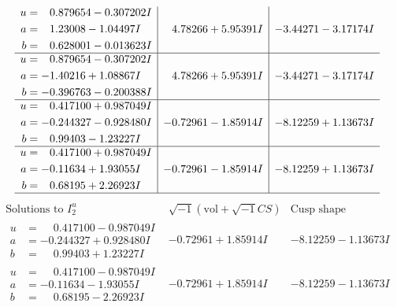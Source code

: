 \documentclass[1p]{elsarticle_modified}
\theoremstyle{definition}
\newcommand{\I}{\sqrt{-1}}
\begin{document}
$$\begin{array}{c|c|c}
\begin{aligned}
u &= \phantom{-}0.879654 - 0.307202 I \\
a &= \phantom{-}1.23008 - 1.04497 I \\
b &= \phantom{-}0.628001 - 0.013623 I\end{aligned}
 & \phantom{-}4.78266 + 5.95391 I & -3.44271 - 3.17174 I \\ \hline\begin{aligned}
u &= \phantom{-}0.879654 - 0.307202 I \\
a &= -1.40216 + 1.08867 I \\
b &= -0.396763 - 0.200388 I\end{aligned}
 & \phantom{-}4.78266 + 5.95391 I & -3.44271 - 3.17174 I \\ \hline\begin{aligned}
u &= \phantom{-}0.417100 + 0.987049 I \\
a &= -0.244327 - 0.928480 I \\
b &= \phantom{-}0.99403 - 1.23227 I\end{aligned}
 & -0.72961 - 1.85914 I & -8.12259 + 1.13673 I \\ \hline\begin{aligned}
u &= \phantom{-}0.417100 + 0.987049 I \\
a &= -0.11634 + 1.93055 I \\
b &= \phantom{-}0.68195 + 2.26923 I\end{aligned}
 & -0.72961 - 1.85914 I & -8.12259 + 1.13673 I\\
 \hline 
 \end{array}$$\newpage$$\begin{array}{c|c|c}  
\text{Solutions to }I^u_{2}& \I (\text{vol} + \sqrt{-1}CS) & \text{Cusp shape}\\
 \hline 
\begin{aligned}
u &= \phantom{-}0.417100 - 0.987049 I \\
a &= -0.244327 + 0.928480 I \\
b &= \phantom{-}0.99403 + 1.23227 I\end{aligned}
 & -0.72961 + 1.85914 I & -8.12259 - 1.13673 I \\ \hline\begin{aligned}
u &= \phantom{-}0.417100 - 0.987049 I \\
a &= -0.11634 - 1.93055 I \\
b &= \phantom{-}0.68195 - 2.26923 I\end{aligned}
 & -0.72961 + 1.85914 I & -8.12259 - 1.13673 I \\ \hline\begin{aligned}

\end{aligned}
\end{array}$$
\end{document}
